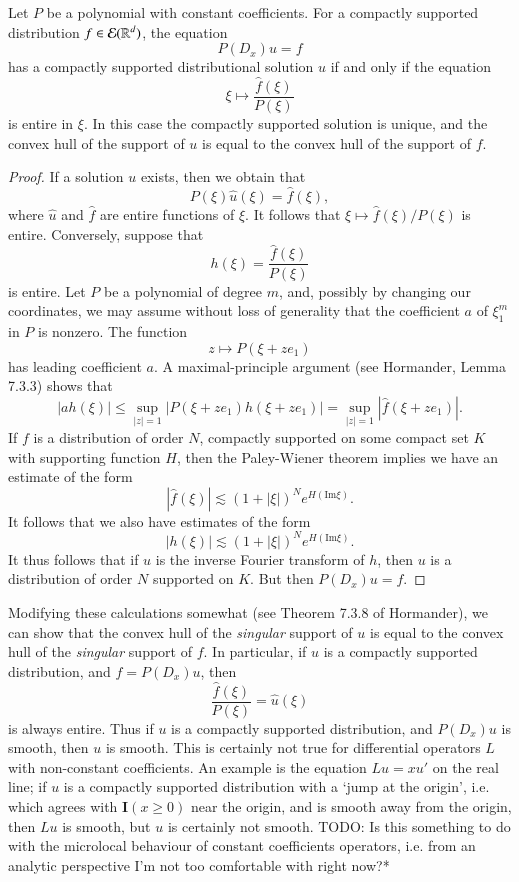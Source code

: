 \begin{theorem}
    Let $P$ be a polynomial with constant coefficients. For a compactly supported distribution $f \in \operatorname{\mathcal{E}}(\operatorname{\mathbb{R}}^d)$, the equation
    \[ P(D_x) u = f \]
    has a compactly supported distributional solution $u$ if and only if the equation
    \[ \xi \mapsto \frac{\widehat{f}(\xi)}{P(\xi)} \]
    is entire in $\xi$. In this case the compactly supported solution is unique, and the convex hull of the support of $u$ is equal to the convex hull of the support of $f$.
\end{theorem}
\begin{proof}
    If a solution $u$ exists, then we obtain that
    \[ P(\xi) \widehat{u}(\xi) = \widehat{f}(\xi), \]
    where $\widehat{u}$ and $\widehat{f}$ are entire functions of $\xi$. It follows that $\xi \mapsto \widehat{f}(\xi) / P(\xi)$ is entire. Conversely, suppose that
    \[ h(\xi) = \frac{\widehat{f}(\xi)}{P(\xi)} \]
    is entire. Let $P$ be a polynomial of degree $m$, and, possibly by changing our coordinates, we may assume without loss of generality that the coefficient $a$ of $\xi_1^m$ in $P$ is nonzero. The function
    \[ z \mapsto P(\xi + z e_1) \]
    has leading coefficient $a$. A maximal-principle argument (see Hormander, Lemma 7.3.3) shows that
    \[ |a h(\xi)| \leq \sup_{|z| = 1} | P(\xi + ze_1) h(\xi + z e_1) | = \sup_{|z| = 1} | \widehat{f} (\xi + z e_1)|.  \]
    If $f$ is a distribution of order $N$, compactly supported on some compact set $K$ with supporting function $H$, then the Paley-Wiener theorem implies we have an estimate of the form
    \[ |\widehat{f}(\xi)| \lesssim (1 + |\xi|)^N e^{H(\text{Im} \xi)}. \]
    It follows that we also have estimates of the form
    \[ |h(\xi)| \lesssim (1 + |\xi|)^N e^{H(\text{Im} \xi)}. \]
    It thus follows that if $u$ is the inverse Fourier transform of $h$, then $u$ is a distribution of order $N$ supported on $K$. But then $P(D_x) u = f$.
\end{proof}

\begin{remark}
    Modifying these calculations somewhat (see Theorem 7.3.8 of Hormander), we can show that the convex hull of the \emph{singular} support of $u$ is equal to the convex hull of the \emph{singular} support of $f$. In particular, if $u$ is a compactly supported distribution, and $f = P(D_x) u$, then
    \[ \frac{\widehat{f}(\xi)}{P(\xi)} = \widehat{u}(\xi) \]
    is always entire. Thus if $u$ is a compactly supported distribution, and $P(D_x) u$ is smooth, then $u$ is smooth. This is certainly not true for differential operators $L$ with non-constant coefficients. An example is the equation $Lu = x u'$ on the real line; if $u$ is a compactly supported distribution with a `jump at the origin', i.e. which agrees with $\mathbf{I}(x \geq 0)$ near the origin, and is smooth away from the origin, then $Lu$ is smooth, but $u$ is certainly not smooth. TODO: Is this something to do with the microlocal behaviour of constant coefficients operators, i.e. from an analytic perspective I'm not too comfortable with right now?*
\end{remark}


